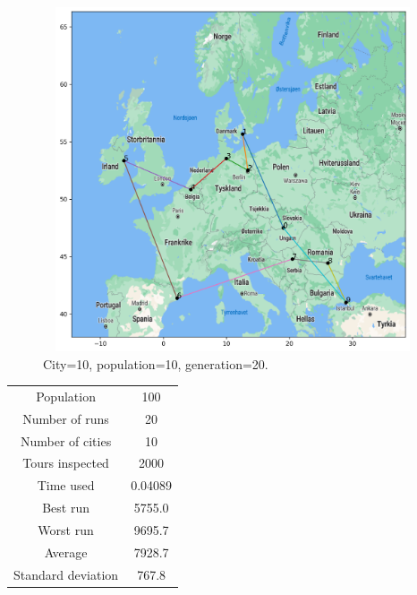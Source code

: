 \documentclass[a4paper,12pt]{article}
\begin{document}
\begin{figure}[H]
\centerline{\includegraphics[width=6in, height=4in]{geneticMap1.png}}
\caption{City=10, population=10, generation=20.}
\label{fig}
\end{figure}

\begin{center}
\begin{tabular}{ c c}
 Population & 100  \\ 
 Number of runs & 20  \\ 
 Number of cities & 10  \\  
Tours inspected & 2000  \\
 Time used & 0.04089   \\  
 Best run & 5755.0  \\ 
Worst run & 9695.7  \\ 
Average & 7928.7   \\ 
 Standard deviation & 767.8   \\ 
\end{tabular}
\end{center}
\end{document}
